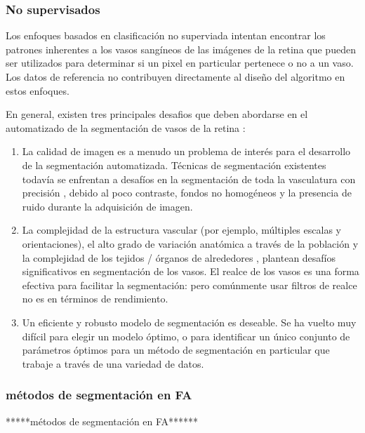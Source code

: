 	\subsubsection{No supervisados}


Los enfoques basados en clasificaci\'on no superviada intentan encontrar los patrones inherentes a los vasos sang\'ineos de las im\'agenes de la retina que pueden ser utilizados para determinar si un pixel en particular pertenece o no a un vaso. Los datos de referencia no contribuyen directamente al dise\~no del algoritmo en estos enfoques.

En general, existen tres principales desafios que deben abordarse en el automatizado de la segmentación de vasos de la retina :
\begin{enumerate}
\item La calidad de imagen es a menudo un problema de interés para el desarrollo de la segmentación automatizada. Técnicas de segmentación existentes todavía se enfrentan a desafíos en la segmentación de toda la vasculatura con precisión , debido al poco contraste, fondos no homogéneos y la presencia de ruido durante la adquisición de imagen.
\item La complejidad de la estructura vascular (por ejemplo, múltiples escalas y orientaciones), el alto grado de variación anatómica a través de la población y la complejidad de los tejidos / órganos de alrededores
, plantean desafíos significativos en segmentación de los vasos. El realce de los vasos es
una forma efectiva para facilitar la segmentación:  pero comúnmente usar filtros de realce no es en términos de rendimiento.
\item Un eficiente y robusto modelo de segmentación  es deseable. Se ha vuelto muy difícil
para elegir un modelo óptimo, o para identificar un único conjunto de parámetros óptimos para un método de segmentación en particular que trabaje a través de una variedad de datos.\cite{zhao2015retinal}
\end{enumerate}



\subsubsection{métodos de segmentación en FA}
*****métodos de segmentación en FA******
